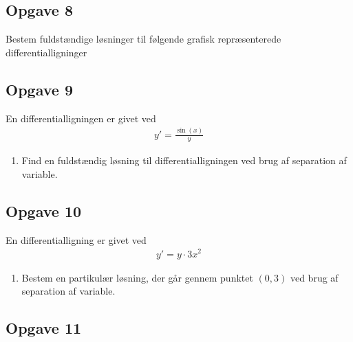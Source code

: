 \subsection*{Opgave 8}
Bestem fuldstændige løsninger til følgende grafisk repræsenterede differentialligninger
\begin{center}
	\resizebox{0.45\textwidth}{!}
	{
	}
	\resizebox{0.45\textwidth}{!}
	{
	}
\end{center}
\newpage
\subsection*{Opgave 9}
En differentialligningen er givet ved
\begin{align*}
	y' = \frac{\sin(x)}{y}
\end{align*}
\begin{enumerate}[label = \roman*)]
	\item Find en fuldstændig løsning til differentialligningen ved brug af separation af variable. 
\end{enumerate}
\subsection*{Opgave 10}
En differentialligning er givet ved
\begin{align*}
	y' = y\cdot 3x^2
\end{align*}
\begin{enumerate}[label = \roman*)]
	\item Bestem en partikulær løsning, der går gennem punktet $(0,3)$ ved brug af separation af variable.
\end{enumerate}
\subsection*{Opgave 11}

